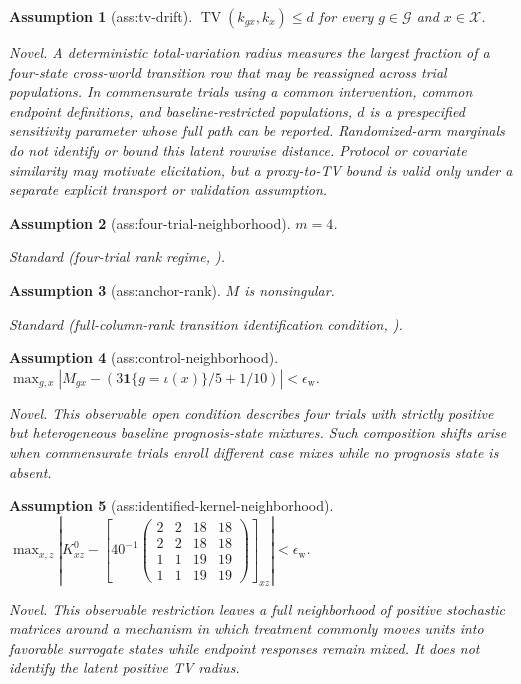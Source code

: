 \documentclass{article}
\newtheorem{assumption}{Assumption}
\begin{document}
\begin{assumption}[ass:tv-drift]\label{ass:tv-drift}
\(\operatorname{TV}(k_{gx},k_x)\le d\) for every \(g\in\mathcal G\) and \(x\in\mathcal X\).
\par\smallskip\noindent\emph{Novel.} A deterministic total-variation radius measures the largest fraction of a four-state cross-world transition row that may be reassigned across trial populations. In commensurate trials using a common intervention, common endpoint definitions, and baseline-restricted populations, \(d\) is a prespecified sensitivity parameter whose full path can be reported. Randomized-arm marginals do not identify or bound this latent rowwise distance. Protocol or covariate similarity may motivate elicitation, but a proxy-to-TV bound is valid only under a separate explicit transport or validation assumption.
\end{assumption}

\begin{assumption}[ass:four-trial-neighborhood]\label{ass:four-trial-neighborhood}
\(m=4\).
\par\smallskip\noindent\emph{Standard} (four-trial rank regime, \cite{WuMao2025}).
\end{assumption}

\begin{assumption}[ass:anchor-rank]\label{ass:anchor-rank}
\(M\) is nonsingular.
\par\smallskip\noindent\emph{Standard} (full-column-rank transition identification condition, \cite{WuMao2025}).
\end{assumption}

\begin{assumption}[ass:control-neighborhood]\label{ass:control-neighborhood}
\(\max_{g,x}|M_{gx}-(3\mathbf 1\{g=\iota(x)\}/5+1/10)|<\epsilon_{\mathrm w}\).
\par\smallskip\noindent\emph{Novel.} This observable open condition describes four trials with strictly positive but heterogeneous baseline prognosis-state mixtures. Such composition shifts arise when commensurate trials enroll different case mixes while no prognosis state is absent.
\end{assumption}

\begin{assumption}[ass:identified-kernel-neighborhood]\label{ass:identified-kernel-neighborhood}
\(\max_{x,z}|K^0_{xz}-[40^{-1}\begin{pmatrix}2&2&18&18\\2&2&18&18\\1&1&19&19\\1&1&19&19\end{pmatrix}]_{xz}|<\epsilon_{\mathrm w}\).
\par\smallskip\noindent\emph{Novel.} This observable restriction leaves a full neighborhood of positive stochastic matrices around a mechanism in which treatment commonly moves units into favorable surrogate states while endpoint responses remain mixed. It does not identify the latent positive TV radius.
\end{assumption}
\end{document}
